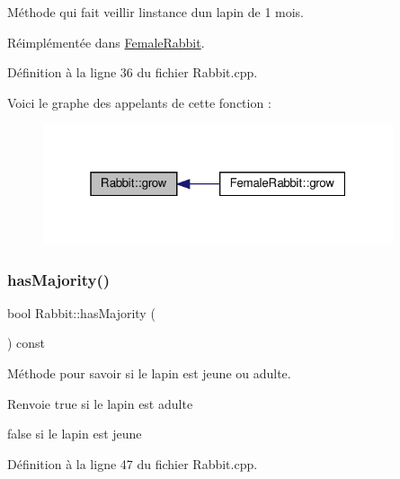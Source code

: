 Méthode qui fait veillir l\textquotesingle{}instance d\textquotesingle{}un lapin de 1 mois. 



Réimplémentée dans \hyperlink{classFemaleRabbit_ad938ea7eca97c53e89d11392b6856ebd}{Female\+Rabbit}.



Définition à la ligne 36 du fichier Rabbit.\+cpp.

Voici le graphe des appelants de cette fonction \+:
\nopagebreak
\begin{figure}[H]
\begin{center}
\leavevmode
\includegraphics[width=292pt]{classRabbit_a404af8877c99ddc98108d88c8e466013_icgraph}
\end{center}
\end{figure}
\mbox{\label{classRabbit_a8087ee3ab0acaa6108e6982933b0f79a}} 
\subsubsection{\texorpdfstring{has\+Majority()}{hasMajority()}}
{\footnotesize\ttfamily bool Rabbit\+::has\+Majority (\begin{DoxyParamCaption}{ }\end{DoxyParamCaption}) const}



Méthode pour savoir si le lapin est jeune ou adulte. 

\begin{DoxyReturn}{Renvoie}
true si le lapin est adulte 

false si le lapin est jeune 
\end{DoxyReturn}


Définition à la ligne 47 du fichier Rabbit.\+cpp.


